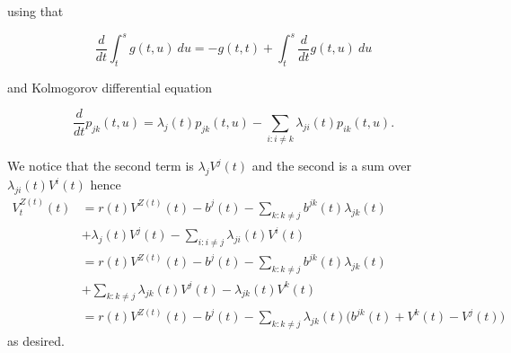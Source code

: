 \documentclass[a4paper,10pt,openany]{book}
\begin{document}
using that

\[
\frac{d}{dt}\int_t^s g(t,u)\ du=-g(t,t)+\int_t^s\frac{d}{dt}g(t,u)\ du
\]

and Kolmogorov differential equation

\[
\frac{d}{dt}p_{jk}(t,u)=\lambda_{j}(t)p_{jk}(t,u)-\sum_{i:i\ne k}\lambda_{ji}(t)p_{ik}(t,u).
\]

We notice that the second term is \(\lambda_jV^j(t)\) and the second is a sum over \(\lambda_{ji}(t)V^i(t)\) hence
\begin{align*}
V_t^{Z(t)}(t)&=r(t)V^{Z(t)}(t)-b^j(t)-\sum_{k :k \ne j}  b^{jk}(t)\lambda_{jk }(t)\\
&+\lambda_j(t)V^j(t)-\sum_{i:i\ne j}\lambda_{ji}(t)V^i(t)\\
&=r(t)V^{Z(t)}(t)-b^j(t)-\sum_{k :k \ne j}  b^{jk}(t)\lambda_{jk }(t)\\
&+\sum_{k:k\ne j}\lambda_{jk}(t)V^j(t)-\lambda_{jk}(t)V^k(t)\\
&=r(t)V^{Z(t)}(t)-b^j(t)-\sum_{k :k \ne j}\lambda_{jk }(t)\Big(b^{jk}(t)+V^k(t)-V^j(t)\Big)
\end{align*}
as desired.
\end{document}
